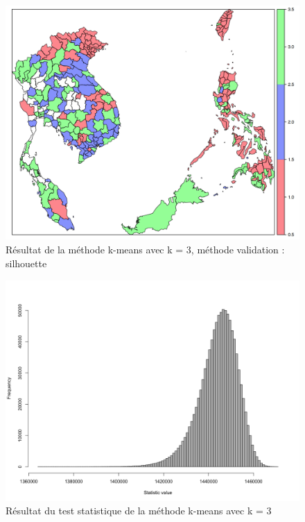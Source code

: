 \begin{figure}[h]
\includegraphics[width = \linewidth]{../figures/chap3/Pic3_1.png}
\caption{Résultat de la méthode k-means avec k = 3, méthode validation : silhouette}
\label{Pic3_1}	
\end{figure}

\begin{figure}[h]
\includegraphics[width = \linewidth]{../figures/chap3/Pic3_2.png}
\caption{Résultat du test statistique de la méthode k-means avec k = 3}
\label{Pic3_2}	
\end{figure}
